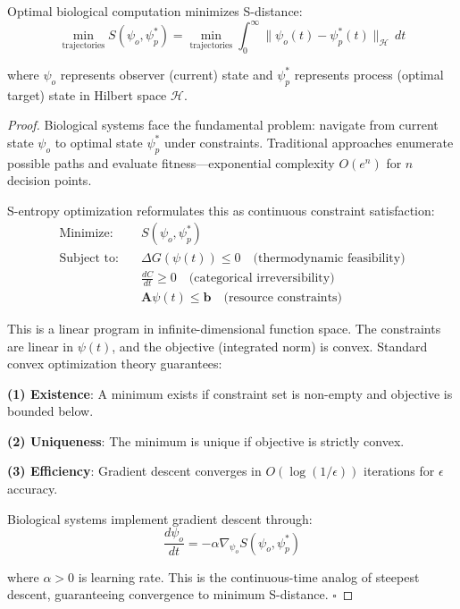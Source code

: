 \begin{theorem}
\label{thm:s_distance_optimization}
Optimal biological computation minimizes S-distance:
\begin{equation}
\min_{\text{trajectories}} S(\psi_o, \psi_p^*) = \min_{\text{trajectories}} \int_0^{\infty} \|\psi_o(t) - \psi_p^*(t)\|_{\mathcal{H}} \, dt
\end{equation}

where $\psi_o$ represents observer (current) state and $\psi_p^*$ represents process (optimal target) state in Hilbert space $\mathcal{H}$.
\end{theorem}

\begin{proof}
Biological systems face the fundamental problem: navigate from current state $\psi_o$ to optimal state $\psi_p^*$ under constraints. Traditional approaches enumerate possible paths and evaluate fitness—exponential complexity $O(e^n)$ for $n$ decision points.

S-entropy optimization reformulates this as continuous constraint satisfaction:
\begin{align}
\text{Minimize:} \quad &S(\psi_o, \psi_p^*) \\
\text{Subject to:} \quad &\Delta G(\psi(t)) \leq 0 \quad \text{(thermodynamic feasibility)} \\
&\frac{dC}{dt} \geq 0 \quad \text{(categorical irreversibility)} \\
&\mathbf{A}\psi(t) \leq \mathbf{b} \quad \text{(resource constraints)}
\end{align}

This is a linear program in infinite-dimensional function space. The constraints are linear in $\psi(t)$, and the objective (integrated norm) is convex. Standard convex optimization theory guarantees:

\textbf{(1) Existence}: A minimum exists if constraint set is non-empty and objective is bounded below.

\textbf{(2) Uniqueness}: The minimum is unique if objective is strictly convex.

\textbf{(3) Efficiency}: Gradient descent converges in $O(\log(1/\epsilon))$ iterations for $\epsilon$ accuracy.

Biological systems implement gradient descent through:
\begin{equation}
\frac{d\psi_o}{dt} = -\alpha \nabla_{\psi_o} S(\psi_o, \psi_p^*)
\end{equation}

where $\alpha > 0$ is learning rate. This is the continuous-time analog of steepest descent, guaranteeing convergence to minimum S-distance. $\square$
\end{proof}

